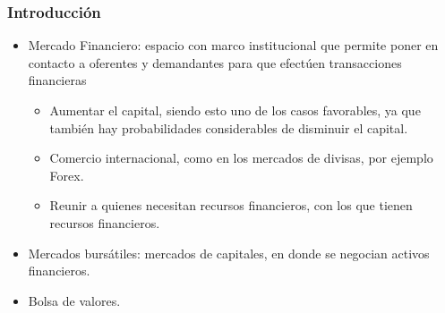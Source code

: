 \frame
{
\frametitle{Introducción}
	\begin{itemize}
		\item Mercado Financiero: espacio con marco institucional que permite poner en contacto a oferentes y demandantes para que efectúen 
			transacciones financieras
		\begin{itemize}
        		\item Aumentar el capital, siendo esto uno de los casos favorables, ya que también hay probabilidades considerables de disminuir el capital.
		        \item Comercio internacional, como en los mercados de divisas, por ejemplo Forex.
		        \item Reunir a quienes necesitan recursos financieros, con los que tienen recursos financieros.
		\end{itemize}
		\item Mercados bursátiles: mercados de capitales, en donde se negocian activos financieros.
		\item Bolsa de valores.
	\end{itemize}
}
